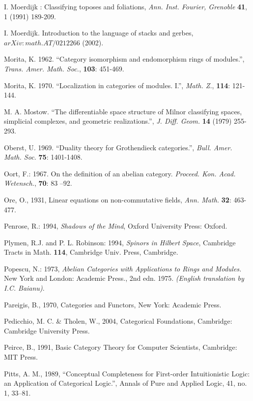 \documentclass[12pt]{article}
\begin{document}
\begin{thebibliography}{399}
I. Moerdijk : Classifying toposes and foliations, {\it Ann. Inst. Fourier, Grenoble} \textbf{41}, 1 (1991) 189-209.

I. Moerdijk. Introduction to the language of stacks and gerbes, $arXiv:math.AT/0212266$ (2002).

Morita, K. 1962. ``Category isomorphism and endomorphism rings of modules.'',
{\em Trans. Amer. Math. Soc.}, \textbf{103}: 451-469.

Morita, K.  1970. ``Localization in categories of modules. I.'', {\em Math. Z.}, 
\textbf{114}: 121-144.

M. A. Mostow. ``The differentiable space structure of Milnor classifying spaces, simplicial complexes, and geometric
realizations.'', \emph{J. Diff. Geom.} \textbf{14} (1979) 255-293.

Oberst, U. 1969. ``Duality theory for Grothendieck categories.'', \emph{Bull. Amer. Math. Soc.} \textbf{75}: 1401-1408.

Oort, F.: 1967. On the definition of an abelian category. {\em Proceed.
Kon. Acad. Wetensch.}, {\bf 70}: 83 --92.

Ore, O., 1931, Linear equations on non-commutative fields, {\em Ann. Math.}
\textbf{32}: 463-477.

Penrose, R.: 1994, \emph{Shadows of the Mind}, Oxford University
Press: Oxford.

Plymen, R.J. and P. L. Robinson: 1994,  \emph{Spinors in Hilbert Space}, Cambridge Tracts in Math. 
\textbf{114}, Cambridge Univ. Press, Cambridge.

Popescu, N.: 1973, \emph{Abelian Categories with Applications to
Rings and Modules.} New York and London: Academic Press., 2nd edn.
1975. \emph{(English translation by I.C. Baianu)}.

Pareigis, B., 1970, Categories and Functors, New York: Academic Press. 

Pedicchio, M. C. \& Tholen, W., 2004, Categorical Foundations, Cambridge: Cambridge University Press. 

Peirce, B., 1991, Basic Category Theory for Computer Scientists, Cambridge: MIT Press. 

Pitts, A. M., 1989, ``Conceptual Completeness for First-order Intuitionistic Logic: an Application of Categorical Logic.'', Annals of Pure and Applied Logic, 41, no. 1, 33--81. 


\end{thebibliography}
\end{document}
